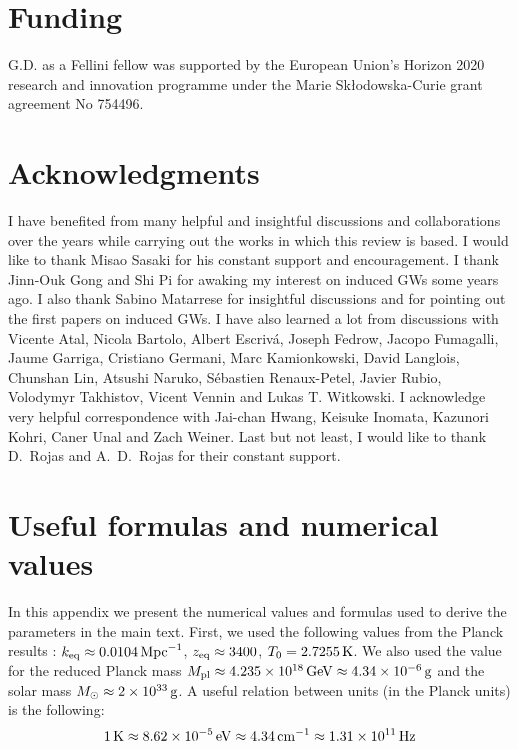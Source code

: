 \documentclass[a4paper,11pt]{article}
\numberwithin{equation}{section}
\begin{document}
\section*{Funding} 
G.D. as a Fellini fellow was supported by the European Union’s Horizon 2020 research and innovation programme under the Marie Sk{\l}odowska-Curie grant 
agreement No 754496.

\section*{Acknowledgments} 
I have benefited from many helpful and insightful discussions and collaborations over the years while carrying out the works in which this review is based. I would like to thank Misao Sasaki for his constant support and encouragement. I thank Jinn-Ouk Gong and Shi Pi for awaking my interest on induced GWs some years ago. I also thank Sabino Matarrese for insightful discussions and for pointing out the first papers on induced GWs. I have also learned a lot from discussions with Vicente Atal, Nicola Bartolo, Albert Escriv{\'a}, Joseph Fedrow, Jacopo Fumagalli, Jaume Garriga, Cristiano Germani, Marc Kamionkowski, David Langlois, Chunshan Lin, Atsushi Naruko, Sébastien Renaux-Petel, Javier Rubio, Volodymyr Takhistov, Vicent Vennin and Lukas T. Witkowski. I acknowledge very helpful correspondence with Jai-chan Hwang, Keisuke Inomata, Kazunori Kohri, Caner Unal and Zach Weiner. Last but not least, I would like to thank D.~Rojas and A.~D.~Rojas for their constant support.




\appendix
\section{Useful formulas and numerical values \label{app:formulasuseful}}
In this appendix we present the numerical values and formulas used to derive the parameters in the main text. First, we used the following values from the Planck results \cite{Aghanim:2018eyx}: $k_{\rm eq}\approx 0.0104 \,{\rm Mpc}^{-1}$, $z_{\rm eq}\approx 3400$, $T_0=2.7255\,{\rm K}$. We also used the value for the reduced Planck mass $M_{\rm pl}\approx 4.235\times 10^{18}\,{\rm GeV}\approx 4.34\times 10^{-6}\,{\rm g}$ and the solar mass $M_\odot\approx 2\times 10^{33}\,{\rm g}$. A useful relation between units (in the Planck units) is the following:
\begin{align}
1\,{\rm K}\approx 8.62\times 10^{-5}\,{\rm eV}\approx4.34\,{\rm cm}^{-1}\approx1.31\times 10^{11}\,{\rm Hz}
\end{align}
\end{document}
